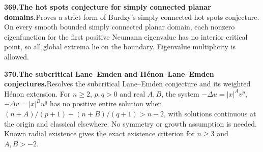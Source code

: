 \documentclass[11pt,a4paper]{article}
\begin{document}
  \par \begin{minipage}{\linewidth}
  \fontsize{10.5}{12.6}\selectfont\RaggedRight
  \hypertarget{result 369}{}
  {\bfseries\textcolor{muted}{369.}\enspace The hot spots conjecture for simply connected planar domains.}\enspace Proves a strict form of Burdzy's simply connected hot spots conjecture. On every smooth bounded simply connected planar domain, each nonzero eigenfunction for the first positive Neumann eigenvalue has no interior critical point, so all global extrema lie on the boundary. Eigenvalue multiplicity is allowed.\par
  \end{minipage}\par\vspace{5pt}



  \par \begin{minipage}{\linewidth}
  \fontsize{10.5}{12.6}\selectfont\RaggedRight
  \hypertarget{result 370}{}
  {\bfseries\textcolor{muted}{370.}\enspace The subcritical Lane--Emden and H\'enon--Lane--Emden conjectures.}\enspace Resolves the subcritical Lane--Emden conjecture and its weighted H\'enon extension. For $n\ge2$, $p,q>0$ and real $A,B$, the system $-\Delta u=|x|^A v^p$, $-\Delta v=|x|^B u^q$ has no positive entire solution when $(n+A)/(p+1)+(n+B)/(q+1)>n-2$, with solutions continuous at the origin and classical elsewhere. No symmetry or growth assumption is needed. Known radial existence gives the exact existence criterion for $n\ge3$ and $A,B>-2$.\par
  \end{minipage}\par\vspace{5pt}
\end{document}
